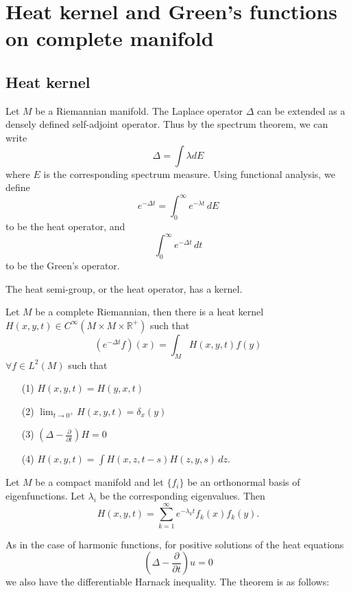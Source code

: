 
\chapter{Heat kernel and Green's functions on complete manifold}\label{Heat_kernel}
\section{Heat kernel}\label{Heat_kernel_def}
Let $M$ be a Riemannian manifold. The Laplace operator $ \Delta $ can be extended as a densely defined 
self-adjoint operator. Thus by the spectrum theorem, we can write
%
\[ \Delta = \int \lambda d E\]
%
where $ E$ is the corresponding spectrum measure. Using functional analysis, we define 
%
\[ e ^{- \Delta t} = \int ^\infty _0 e ^{- \lambda t } \, dE\]
%
to be the heat operator, and 
\[\int^\infty _ 0 e ^{-\Delta t} \, dt \]
%  
to be the Green's operator.

The heat semi-group, or the heat operator, has a kernel.

\begin{theorem} Let $M$ be a complete Riemannian, then there is a heat kernel $ H (x, y, t) \in C^\infty (M \times M \times \mathbb{R} ^+ )$ such that 
%
\[ (e ^{- \Delta t} f) (x) = \int_M  H (x, y, t )f (y) \]
%
$ \forall f \in L^2 (M) $ such that 
%
\begin{enumerate}
\item    [{\rm (1)}]  $H(x, y, t) = H (y, x, t)$  
\item   [{\rm (2)}]  $ \lim_{t \rightarrow 0^{+} } H (x, y, t) = \delta _x (y)$
\item   [{\rm (3)}]  $ \left( \Delta - \frac{\partial }{\partial t} \right) H = 0$
\item   [{\rm (4)}]  $ H(x, y, t) =  \int H (x, z, t - s) H (z, y, s) \, dz.$
\end{enumerate}
\end{theorem}

\begin{remark}
Let $M$ be a compact manifold and let $ \{ f_i\} $ be an orthonormal basis of eigenfunctions. Let $ \lambda _i $ be the corresponding eigenvalues. Then
%
\[ H(x, y, t) = \sum^\infty_{k=1} e ^{-\lambda _{k} t} f _k (x) f_k  (y) .\]

As in the case of harmonic functions, for positive solutions of the heat equations
%
\[ \left( \Delta - \frac{\partial }{\partial t} \right) u= 0\]
%
we also have the differentiable Harnack inequality. The  theorem is as follows:
\end{remark}

